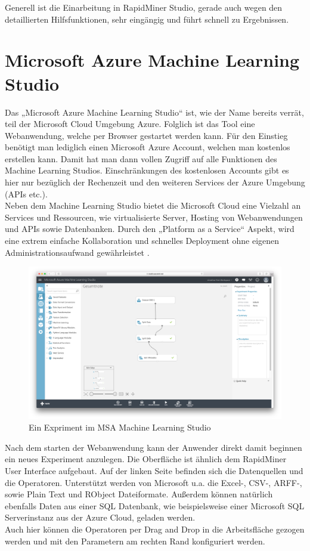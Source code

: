 Generell ist die Einarbeitung in RapidMiner Studio, gerade auch wegen den
detaillierten Hilfsfunktionen, sehr eingängig und führt schnell zu Ergebnissen.

\pagebreak

\section{Microsoft Azure Machine Learning Studio}
\label{sec:software:msa}

Das „Microsoft Azure Machine Learning Studio“ ist, wie der Name bereits verrät,
teil der Microsoft Cloud Umgebung Azure. Folglich ist das Tool eine Webanwendung,
welche per Browser gestartet werden kann.  Für den Einstieg benötigt man
lediglich einen Microsoft Azure Account, welchen man kostenlos erstellen kann.
Damit hat man dann vollen Zugriff auf alle Funktionen des Machine Learning
Studios. Einschränkungen des kostenlosen Accounts gibt es hier nur bezüglich
der Rechenzeit und den weiteren Services der Azure Umgebung (APIs etc.). \\
Neben dem Machine Learning Studio bietet die Microsoft Cloud eine Vielzahl an
Services und Ressourcen, wie virtualisierte Server, Hosting von Webanwendungen
und APIs sowie Datenbanken. Durch den „Platform as a Service“ Aspekt, wird eine
extrem einfache Kollaboration und schnelles Deployment ohne eigenen
Administrationsaufwand gewährleistet \cite{MSA:15}.

\begin{figure}[htb]
	\includegraphics[width=\textwidth]{gfx/ml1.png}
	\caption{Ein Expriment im MSA Machine Learning Studio}
	\label{fig:software:ml:des}
\end{figure}

Nach dem starten der Webanwendung kann der Anwender direkt damit beginnen ein
neues Experiment anzulegen. Die Oberfläche ist ähnlich dem RapidMiner User
Interface aufgebaut. Auf der linken Seite befinden sich die Datenquellen und
die Operatoren. Unterstützt werden von Microsoft u.a. die Excel-, CSV-, ARFF-,
sowie Plain Text und RObject Dateiformate. Außerdem können natürlich ebenfalls
Daten aus einer SQL Datenbank, wie beispielsweise einer Microsoft SQL
Serverinstanz aus der Azure Cloud, geladen werden. \\
Auch hier können die Operatoren per Drag and Drop in die Arbeitsfläche gezogen
werden und mit den Parametern am rechten Rand konfiguriert werden.

